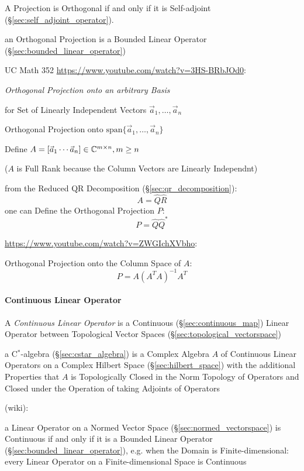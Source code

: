 A Projection is Orthogonal if and only if it is Self-adjoint
(\S\ref{sec:self_adjoint_operator}).

an Orthogonal Projection is a Bounded Linear Operator
(\S\ref{sec:bounded_linear_operator})


UC Math 352 \url{https://www.youtube.com/watch?v=3HS-BRbJOd0}:

\emph{Orthogonal Projection onto an arbitrary Basis}

for Set of Linearly Independent Vectors $\vec{a}_1, \ldots, \vec{a}_n$

Orthogonal Projection onto $\mathrm{span}\{\vec{a}_1, \ldots, \vec{a}_n\}$

Define $A = [\vec{a}_1 \cdots \vec{a}_n] \in \mathbb{C}^{m \times n}, m \geq n$

($A$ is Full Rank because the Column Vectors are Linearly Independnt)

from the Reduced QR Decomposition (\S\ref{sec:qr_decomposition}):
\[
  A = \hat{Q}\hat{R}
\]
one can Define the Orthogonal Projection $P$:
\[
  P = \hat{Q}\hat{Q}^*
\]


\url{https://www.youtube.com/watch?v=ZWGIchXVbho}:

Orthogonal Projection onto the Column Space of $A$:
\[
  P = A(A^TA)^{-1}A^T
\]



\paragraph{Continuous Linear Operator}\label{sec:continuous_linear}\hfill

A \emph{Continuous Linear Operator} is a Continuous
(\S\ref{sec:continuous_map}) Linear Operator between Topological
Vector Spaces (\S\ref{sec:topological_vectorspace})

a C$^*$-algebra (\S\ref{sec:cstar_algebra}) is a Complex Algebra $A$
of Continuous Linear Operators on a Complex Hilbert Space
(\S\ref{sec:hilbert_space}) with the additional Properties that $A$ is
Topologically Closed in the Norm Topology of Operators and Closed
under the Operation of taking Adjoints of Operators

(wiki):

a Linear Operator on a Normed Vector Space
(\S\ref{sec:normed_vectorspace}) is Continuous if and only if it is a
Bounded Linear Operator (\S\ref{sec:bounded_linear_operator}), e.g.
when the Domain is Finite-dimensional: every Linear Operator on a
Finite-dimensional Space is Continuous



